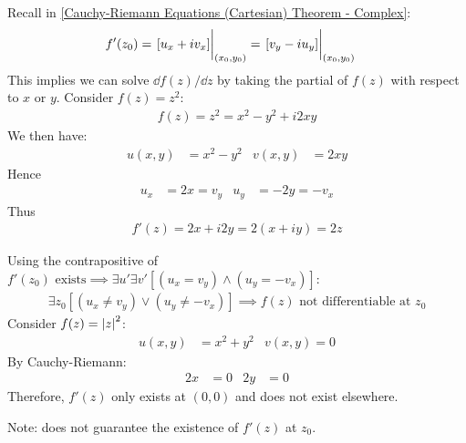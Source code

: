 \documentclass[12pt, english]{book}
\begin{document}
	\begin{example} 
		Recall in \cref{Cauchy-Riemann Equations (Cartesian) Theorem - Complex}: 
		\begin{align*}
			f'(z_0) &= \eval{[u_x + iv_x]}_{(x_0, y_0)} 
			= \eval{[v_y - i u_y]}_{(x_0, y_0)}
		\end{align*}
		This implies we can solve \(\dd{f(z)} /\dd{z}\) by taking the partial of \(f(z)\) with respect to \(x\) or \(y\). Consider \(f(z) = z^2\):
		\begin{align*}
			f(z) = z^2 = x^2 - y^2 + i2xy
		\end{align*}
		We then have:
		\begin{align*}
			u(x,y) &= x^2 - y^2	& v(x,y) &= 2xy
		\end{align*}
		Hence
		\begin{align*}
			u_x &= 2x = v_y	&
			u_y &= -2y = -v_x	
		\end{align*}
		Thus
		\begin{align*}
			f'(z) = 2x + i2y = 2(x+iy) = 2z 
		\end{align*}
	\end{example}
	
	\begin{example}
		Using the contrapositive of \(f'(z_0) \text{ exists} \implies \exists u' \exists v' [(u_x = v_y)\land(u_y = -v_x)]\):
		\begin{align*}
			\exists z_0 [(u_x \neq v_y)\lor(u_y \neq -v_x)] \implies f(z) \text{ not differentiable at } z_0 
		\end{align*}
		Consider \(f(z) = \abs{z}^2\):
		\begin{align*}
			u(x,y) &= x^2 + y^2	&
			v(x,y) = 0
		\end{align*}
		By Cauchy-Riemann: 
		\begin{align*}
			2x &= 0 & 2y &= 0
		\end{align*}
		Therefore, \(f'(z)\) only exists at \((0,0)\) and does not exist elsewhere. 
	\end{example}	

	Note:  does not guarantee the existence of \(f'(z)\) at \(z_0\).
	
\end{document}
